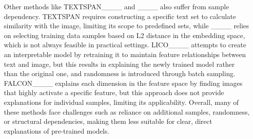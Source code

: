 Other methods like TEXTSPAN____ and ____ also suffer from sample dependency. TEXTSPAN requires constructing a specific text set to calculate similarity with the image, limiting its scope to predefined sets, while ____ relies on selecting training data samples based on L2 distance in the embedding space, which is not always feasible in practical settings. LICO____ attempts to create an interpretable model by retraining it to maintain feature relationships between text and image, but this results in explaining the newly trained model rather than the original one, and randomness is introduced through batch sampling. FALCON____ explains each dimension in the feature space by finding images that highly activate a specific feature, but this approach does not provide explanations for individual samples, limiting its applicability. Overall, many of these methods face challenges such as reliance on additional samples, randomness, or structural dependencies, making them less suitable for clear, direct explanations of pre-trained models.